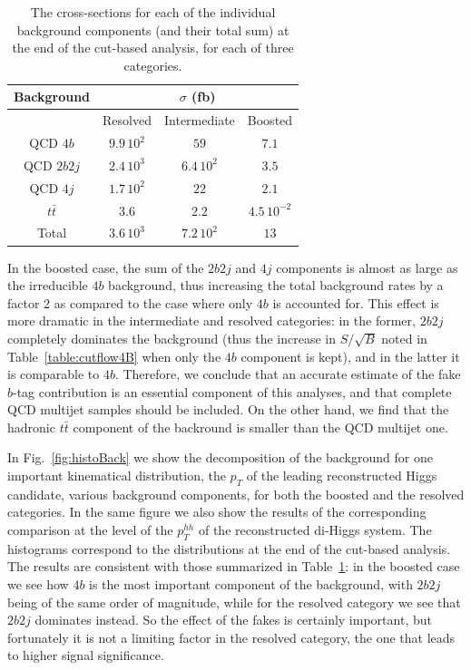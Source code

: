 \begin{table}[h]
  \centering
  \begin{tabular}{c|c|c|c}
    \hline
    Background  &    \multicolumn{3}{c}{$\sigma$ (fb)}   \\
    \hline
  &    Resolved  &  Intermediate  &   Boosted \\
    \hline
    \hline
  QCD $4b$   &   $9.9\,10^{2}$       &  $59$       &   $7.1$        \\
  QCD $2b2j$ &   $2.4\,10^{3}$       &  $6.4\,10^{2}$       &   $3.5$        \\
  QCD $4j$ &     $1.7\,10^{2}$       &   $22$      &    $2.1$        \\
  $t\bar{t}$ &   $3.6$       &  $2.2$       &   $4.5\,10^{-2}$        \\
  \hline
  \hline
Total     &    $3.6\,10^{3}$      &   $7.2\,10^{2}$      &     $13$      \\
\hline
\end{tabular}
    \caption{\small The cross-sections for each of the individual background
      components (and their total sum) at the end of the cut-based
      analysis, for each of three categories.
    \label{table:cutflowBack}
    }
\end{table}

In the boosted case, the sum of the $2b2j$ and $4j$ components is almost as large as the
irreducible $4b$ background, thus increasing the total background rates by a factor 2 as compared
to the case where only $4b$ is accounted for.
%
This effect is more dramatic in the intermediate and resolved categories: in the former,
$2b2j$ completely dominates the background (thus the increase in $S/\sqrt{B}$ noted in
Table~\ref{table:cutflow4B}  when only the $4b$ component is kept), and in the latter
it is comparable to $4b$.
%
Therefore, we conclude that an accurate estimate of the fake $b$-tag contribution is
an essential component of this analyses, and that complete QCD multijet samples
should be included.
%
On the other hand, we find that the hadronic $t\bar{t}$ component of the backround
is smaller than the QCD multijet one.

In Fig.~\ref{fig:histoBack} we show the decomposition of the background for one important kinematical
distribution, the $p_T$ of the leading reconstructed Higgs candidate, various background
components, for both the boosted and the resolved categories.
%
In the same figure we also show the results of the corresponding comparison
at the level of the $p_T^{hh}$ of the
reconstructed di-Higgs system.
%
The histograms correspond to the distributions at the end of the cut-based
analysis.
%
The results are consistent with those summarized in
Table~\ref{table:cutflowBack}: in the boosted case we see how $4b$ is the most important
component of the background, with $2b2j$ being of the same order of magnitude, while
for the resolved category we see that $2b2j$ dominates instead.
%
So the effect of the fakes is certainly important, but fortunately it is not a limiting factor
in the resolved category, the one that leads to higher signal significance.

